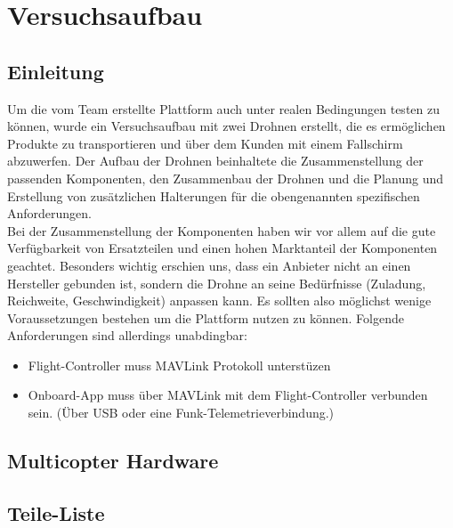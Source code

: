 \chapter{Versuchsaufbau}

\section{Einleitung}

Um die vom Team erstellte Plattform auch unter realen Bedingungen testen zu können, wurde ein Versuchsaufbau mit zwei Drohnen erstellt, die es ermöglichen Produkte zu transportieren und über dem Kunden mit einem Fallschirm abzuwerfen. Der Aufbau der Drohnen beinhaltete die Zusammenstellung der passenden Komponenten, den Zusammenbau der Drohnen und die Planung und Erstellung von zusätzlichen Halterungen für die obengenannten spezifischen Anforderungen.\\

Bei der Zusammenstellung der Komponenten haben wir vor allem auf die gute Verfügbarkeit von Ersatzteilen und einen hohen Marktanteil der Komponenten geachtet. Besonders wichtig erschien uns, dass ein Anbieter nicht an einen Hersteller gebunden ist, sondern die Drohne an seine Bedürfnisse (Zuladung, Reichweite, Geschwindigkeit) anpassen kann. Es sollten also möglichst wenige Voraussetzungen bestehen um die Plattform nutzen zu können. Folgende Anforderungen sind allerdings unabdingbar:

\begin{itemize}

\item Flight-Controller muss \Gls{MAVLink} Protokoll unterstüzen
\item Onboard-App muss über MAVLink mit dem Flight-Controller verbunden sein. (Über USB oder eine Funk-Telemetrieverbindung.)
\end{itemize}

\section{Multicopter Hardware}

\section{Teile-Liste}

